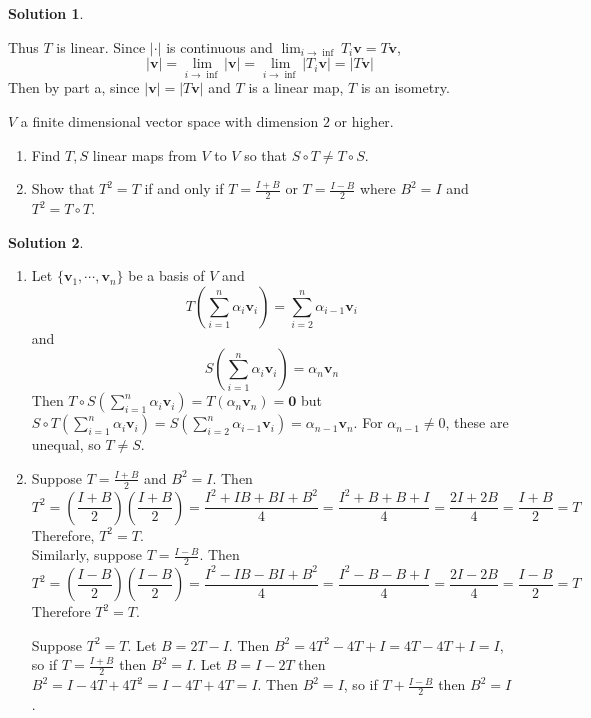 \documentclass[11pt]{article}
\theoremstyle{definition}
\newenvironment{customex}[1]
  {\renewcommand\theinnercustomex{#1}\innercustomex}
  {\endinnercustomex}
\newtheorem*{solution}{Solution}
\newcommand{\vv}{\mathbf{v}}
\newcommand{\vzero}{\mathbf{0}}
\begin{document}
\begin{solution}
\begin{enumerate}[label = \alph*)]
            Thus $T$ is linear. Since $|\cdot|$ is continuous and $\lim_{i \to \inf} T_i\vv = T\vv$, $$|\vv| = \lim_{i \to \inf} |\vv| = \lim_{i \to \inf} |T_i\vv| = |T\vv|$$Then by part a, since $|\vv| = |T\vv|$ and $T$ is a linear map, $T$ is an isometry.
        \end{enumerate}
    \end{solution}

    \begin{customex}{\textbf{4}}
        $V$ a finite dimensional vector space with dimension $2$ or higher.
        \begin{enumerate}[label = \alph*)]
            \item Find $T, S$ linear maps from $V$ to $V$ so that $S \circ T \neq T \circ S$.
            \item Show that $T^2 = T$ if and only if $T = \frac{I + B}{2}$ or $T = \frac{I - B}{2}$ where $B^2 = I$ and $T^2 = T \circ T$.
        \end{enumerate}
    \end{customex}

    \begin{solution}
        \begin{enumerate}[label = \alph*)]
            \item Let $\{\vv_1, \cdots, \vv_n\}$ be a basis of $V$ and $$T(\sum_{i=1}^n \alpha_i \vv_i) = \sum_{i=2}^n \alpha_{i-1}\vv_i$$and$$S(\sum_{i=1}^n \alpha_i \vv_i) = \alpha_n \vv_n$$Then $T\circ S(\sum_{i=1}^n \alpha_i \vv_i) = T(\alpha_n\vv_n) = \vzero$ but $S \circ T(\sum_{i=1}^n \alpha_i \vv_i) = S(\sum_{i=2}^n \alpha_{i-1}\vv_i) = \alpha_{n-1}\vv_n$. For $\alpha_{n-1} \neq 0$, these are unequal, so $T \neq S$.
            \item Suppose $T = \frac{I + B}{2}$ and $B^2 = I$. Then $$T^2 = \left(\frac{I + B}{2}\right)\left(\frac{I + B}{2}\right) = \frac{I^2 + IB + BI + B^2}{4} = \frac{I^2 + B + B + I}{4} = \frac{2I + 2B}{4} = \frac{I + B}{2} = T$$Therefore, $T^2 = T$.\\Similarly, suppose $T = \frac{I - B}{2}$. Then $$T^2 = \left(\frac{I - B}{2}\right)\left(\frac{I - B}{2}\right) = \frac{I^2 -IB -BI + B^2}{4} = \frac{I^2 - B - B + I}{4} = \frac{2I - 2B}{4} = \frac{I - B}{2} = T$$Therefore $T^2 = T$. 
            
            Suppose $T^2 = T$. Let $B = 2T - I$. Then $B^2 = 4T^2 - 4T + I = 4T - 4T + I = I$, so if $T = \frac{I + B}{2}$ then $B^2 = I$. Let $B = I - 2T$ then $B^2 = I - 4T + 4T^2 = I - 4T + 4T = I$. Then $B^2 = I$, so if $T + \frac{I - B}{2}$ then $B^2 = I$.
        \end{enumerate}
    \end{solution}
\end{document}
